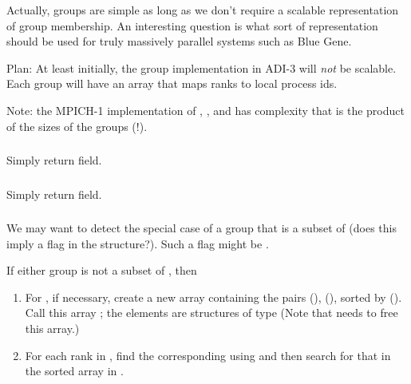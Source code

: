 \documentclass{article}
\begin{document}
Actually, groups are simple as long as we don't require a scalable
representation of group membership.  An interesting question is what
sort of representation should be used for truly massively parallel
systems such as Blue Gene.  

Plan: At least initially, the group implementation in ADI-3 will \emph{not} be
scalable.  Each group will have an array that maps ranks to local process ids.

Note: the MPICH-1 implementation of ,
, and  has complexity
that is the product of the sizes of the groups (!).

\subsubsection{}
Simply return  field.

\subsubsection{}
Simply return  field.

\subsubsection{}
We may want to detect the special case of a group that is a subset of
 (does this imply a flag in the 
structure?).  Such a flag might be
. 

\begin{algorithm}
If either group is not a subset of , then 
\begin{enumerate}
\item For , if necessary, create a new array containing the pairs
   (), 
  (), sorted by  (). Call this array
; the elements are 
  structures of type
  (Note that  needs to free this array.)
\item For each rank in , find the corresponding  
  using  and then search for that 
  in 
  the sorted array  in .
\end{enumerate}
\end{algorithm}
\end{document}
